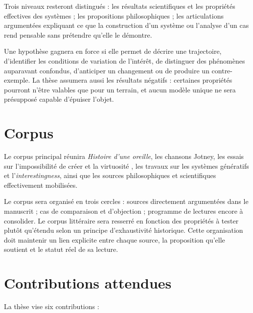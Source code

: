 \documentclass[11pt,a4paper]{article}
\begin{document}
Trois niveaux resteront distingués : les résultats scientifiques et les
propriétés effectives des systèmes ; les propositions philosophiques ; les
articulations argumentées expliquant ce que la construction d'un système ou
l'analyse d'un cas rend pensable sans prétendre qu'elle le démontre.

Une hypothèse gagnera en force si elle permet de décrire une trajectoire,
d'identifier les conditions de variation de l'intérêt, de distinguer des
phénomènes auparavant confondus, d'anticiper un changement ou de produire un
contre-exemple. La thèse assumera aussi les résultats négatifs : certaines
propriétés pourront n'être valables que pour un terrain, et aucun modèle unique
ne sera présupposé capable d'épuiser l'objet.

\section{Corpus}

Le corpus principal réunira \emph{Histoire d'une oreille}, les chansons Jotney,
les essais sur l'impossibilité de créer et la virtuosité
\parencite{pachet2018oreille,pachet2026impossibilite,pachet2027virtuosite}, les
travaux sur les systèmes génératifs et l'\emph{interestingness}, ainsi que les
sources philosophiques et scientifiques effectivement mobilisées.

Le corpus sera organisé en trois cercles : sources directement argumentées dans
le manuscrit ; cas de comparaison et d'objection ; programme de lectures encore
à consolider. Le corpus littéraire sera resserré en fonction des propriétés à
tester plutôt qu'étendu selon un principe d'exhaustivité historique. Cette
organisation doit maintenir un lien explicite entre chaque source, la
proposition qu'elle soutient et le statut réel de sa lecture.

\section{Contributions attendues}

La thèse vise six contributions :
\end{document}
